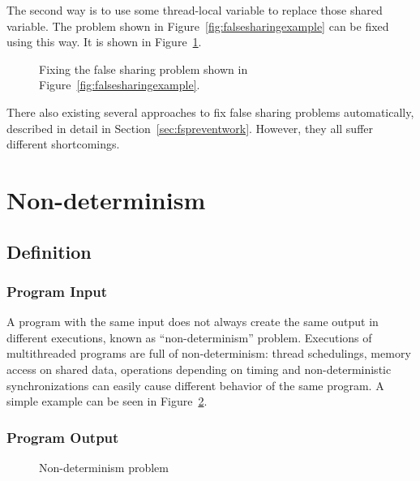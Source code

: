 The second way is to use some thread-local variable to replace those shared variable.
The problem shown in Figure~\ref{fig:falsesharingexample} can be fixed using this way. It is shown in Figure~\ref{fig:falsesharingexamplefix}. 

\begin{figure}[!ht]
{\centering
\fbox{
\subfigure{}
}
\caption{Fixing the false sharing problem shown in Figure~\ref{fig:falsesharingexample}.
\label{fig:falsesharingexamplefix}}
}
\end{figure}

There also existing several approaches to fix false sharing problems automatically, described in detail in Section~\ref{sec:fspreventwork}. However, they all suffer different shortcomings. 




\section{Non-determinism}

\subsection{Definition}

\subsubsection{Program Input}
A program with the same input does not always create the same output in different executions,
known as ``non-determinism'' problem.
Executions of multithreaded programs are full of non-determinism: 
thread schedulings, memory access on shared data, operations depending on timing 
and non-deterministic synchronizations can easily cause different behavior of the same program.
A simple example can be seen in Figure~\ref{fig:nondeterminism}.

\subsubsection{Program Output}

\begin{figure}[!ht]
{\centering
\fbox{
\subfigure{}
\hspace{12pt}
\subfigure{}
\hspace{12pt}
\subfigure{}
}
\caption{Non-determinism problem 
\label{fig:nondeterminism}}
}
\end{figure}

